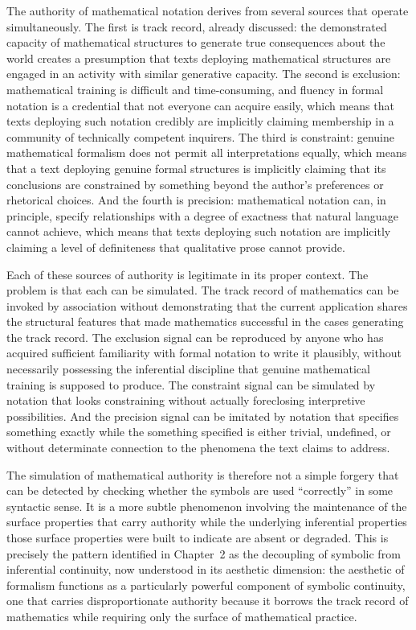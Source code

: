 \documentclass[12pt, openright, twoside]{book}
\begin{document}
The authority of mathematical notation derives from several sources that
operate simultaneously. The first is track record, already discussed: the
demonstrated capacity of mathematical structures to generate true consequences
about the world creates a presumption that texts deploying mathematical
structures are engaged in an activity with similar generative capacity.
The second is exclusion: mathematical training is difficult and time-consuming,
and fluency in formal notation is a credential that not everyone can acquire
easily, which means that texts deploying such notation credibly are implicitly
claiming membership in a community of technically competent inquirers. The
third is constraint: genuine mathematical formalism does not permit all
interpretations equally, which means that a text deploying genuine formal
structures is implicitly claiming that its conclusions are constrained by
something beyond the author's preferences or rhetorical choices. And the
fourth is precision: mathematical notation can, in principle, specify
relationships with a degree of exactness that natural language cannot achieve,
which means that texts deploying such notation are implicitly claiming a level
of definiteness that qualitative prose cannot provide.

Each of these sources of authority is legitimate in its proper context. The
problem is that each can be simulated. The track record of mathematics can
be invoked by association without demonstrating that the current application
shares the structural features that made mathematics successful in the cases
generating the track record. The exclusion signal can be reproduced by anyone
who has acquired sufficient familiarity with formal notation to write it
plausibly, without necessarily possessing the inferential discipline that
genuine mathematical training is supposed to produce. The constraint signal
can be simulated by notation that looks constraining without actually
foreclosing interpretive possibilities. And the precision signal can be
imitated by notation that specifies something exactly while the something
specified is either trivial, undefined, or without determinate connection
to the phenomena the text claims to address.

The simulation of mathematical authority is therefore not a simple forgery
that can be detected by checking whether the symbols are used ``correctly''
in some syntactic sense. It is a more subtle phenomenon involving the
maintenance of the surface properties that carry authority while the
underlying inferential properties those surface properties were built to
indicate are absent or degraded. This is precisely the pattern identified
in Chapter~2 as the decoupling of symbolic from inferential continuity,
now understood in its aesthetic dimension: the aesthetic of formalism
functions as a particularly powerful component of symbolic continuity,
one that carries disproportionate authority because it borrows the track
record of mathematics while requiring only the surface of mathematical
practice.
\end{document}
